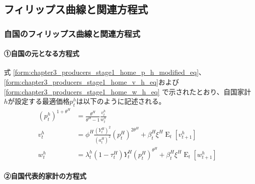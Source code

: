 
\subsection{フィリップス曲線と関連方程式}
\label{sec:chapter3_representative_household_phillips}

\subsubsection{自国のフィリップス曲線と関連方程式}
\label{sec:chapter3_representative_household_phillips_home}

\paragraph{①自国の元となる方程式}
\label{sec:chapter3_representative_household_phillips_home_original}
式
\eqref{form:chapter3_producers_stage1_home_p_h_modified_eq}、
\eqref{form:chapter3_producers_stage1_home_v_h_eq}および
\eqref{form:chapter3_producers_stage1_home_w_h_eq}
で示されたとおり、自国家計\(h\)が設定する最適価格\(p_t^h\)は以下のように記述される。
\begin{align}
    \label{form:chapter3_representative_household_phillips_home_original_p_h_eq}
        (p_t^h)^{1+\theta^H}&=\frac{\theta^H}{\theta^H-1}\frac{v_t^h}{w_t^h} \\
    \label{form:chapter3_representative_household_phillips_home_original_v_h_eq}
        v_t^h&=\phi^H\frac{(Y_t^H)^2}{(a_t^H)^2}(p_t^H)^{2\theta^H}+\beta_t^H\xi^H\operatorname{E}_t[v_{t+1}^h] \\
    \label{form:chapter3_representative_household_phillips_home_original_w_h_eq}
        w_t^h&=\lambda_t^h(1-\tau_t^H)Y_t^H(p_t^H)^{\theta^H}+\beta_t^H\xi^H\operatorname{E}_t[w_{t+1}^h]
\end{align}

\paragraph{②自国代表的家計の方程式}
\label{sec:chapter3_representative_household_phillips_home_representative}

